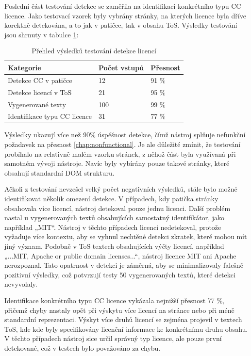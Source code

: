 Poslední část testování detekce se zaměřila na identifikaci konkrétního typu CC licence.
Jako testovací vzorek byly vybrány stránky, na kterých licence byla dříve korektně detekována, a to jak v patičce, tak v obsahu ToS.
Výsledky testování jsou shrnuty v tabulce \ref{tab:test_results}:
\begin{table}[H]
	\centering
	\begin{tabular}{|p{}|p{}|p{}|}
		\hline
		\textbf{Kategorie} & \textbf{Počet vstupů} & \textbf{Přesnost} \\ \hline
        {Detekce CC v patičce} & 12 & 91 \% \\ \hline
		{Detekce licencí v ToS} & 21 & 95 \% \\ \hline
        {Vygenerované texty} & 100 & 99 \% \\ \hline
        {Identifikace typu CC licence} & 31 & 77 \% \\ \hline
	\end{tabular}
	\caption{Přehled výsledků testování detekce licencí}
	\label{tab:test_results}
\end{table}

Výsledky ukazují více než 90\% úspěšnost detekce, čímž nástroj splňuje nefunkční požadavek na přesnost \ref{chap:nonfunctional}.
Je ale důležité zmínit, že testování probíhalo na relativně malém vzorku stránek, z něhož část byla využívaná při samotném vývoji nástroje.
Navíc byly vybírány pouze takové stránky, které obsahují standardní DOM strukturu.

Ačkoli z testování nevzešel velký počet negativních výsledků, stále bylo možné identifikovat několik omezení detekce.
V případech, kdy patička stránky obsahovala více licencí, nástroj detekoval pouze jednu licenci.
Další problém nastal u vygenerovaných textů obsahujících samostatný identifikátor, jako například „MIT“.
Nástroj v těchto případech licenci nedetekoval, protože vyžaduje více kontextu, aby se vyhnul nechtěné detekci zkratek, které mohou mít jiný význam.
Podobně v ToS textech obsahujících výčty licencí, například „...MIT, Apache or public domain licenses...“, nástroj licence MIT ani Apache nerozpoznal.
Tato opatrnost v detekci je záměrná, aby se minimalizovaly falešně pozitivní výsledky, což potvrzují testy 50 vygenerovaných textů, které detekci nevyvolaly.

Identifikace konkrétního typu CC licence vykázala nejnižší přesnost 77 \%, přičemž chyby nastaly opět při výskytu více licencí na stránce nebo při méně standardní reprezentaci.
Výskyt více druhů licencí se zejména projevil v textech ToS, kde kde byly specifikovány licenční informace ke konkrétnímu druhu obsahu.
V těchto případech nástroj sice určil správný typ licence, ale pouze první detekované, což v testech bylo považováno za chybu.

